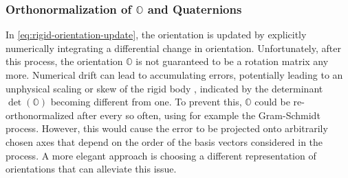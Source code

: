 \documentclass[oneside, a4paper]{book}
\newcommand\br[1]{\left(#1\right)}
\begin{document}
    \subsubsection{Orthonormalization of $\mathds{O}$ and Quaternions}
    In \autoref{eq:rigid-orientation-update}, the orientation is updated by explicitly numerically integrating a differential change in orientation. Unfortunately, after this process, the orientation $\mathds{O}$ is not guaranteed to be a rotation matrix any more. Numerical drift can lead to accumulating errors, potentially leading to an unphysical scaling or skew of the rigid body \autocite{physically-based-rigids}, indicated by the determinant $\det\br{\mathds{O}}$ becoming different from one. To prevent this, $\mathds{O}$ could be re-orthonormalized after every so often, using for example the Gram-Schmidt process. However, this would cause the error to be projected onto arbitrarily chosen axes that depend on the order of the basis vectors considered in the process. A more elegant approach is choosing a different representation of orientations that can alleviate this issue.
\end{document}
